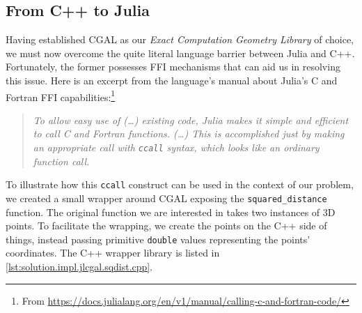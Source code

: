 \subsection{From C++ to Julia}%
\label{sec:solution.impl.jlcgal}


Having established \ac{CGAL} as our \textit{Exact Computation Geometry Library}
of choice, we must now overcome the quite literal language barrier between Julia
and C++.  Fortunately, the former possesses \ac{FFI} mechanisms that can aid us
in resolving this issue.  Here is an excerpt from the language's manual about
Julia's C and Fortran \ac{FFI} capabilities:\footnote{From
\url{https://docs.julialang.org/en/v1/manual/calling-c-and-fortran-code/}}

\begin{quote}
  \itshape\color{gray}
  To allow easy use of (\ldots) existing code, Julia makes it simple and
  efficient to call C and Fortran functions.  (\ldots) This is accomplished just
  by making an appropriate call with \texttt{ccall} syntax, which
  looks like an ordinary function call.
\end{quote}

To illustrate how this \texttt{ccall} construct can be used in the
context of our problem, we created a small wrapper around \ac{CGAL} exposing the
\texttt{squared\_distance} function.  The original function we are interested in
takes two instances of 3D points.  To facilitate the wrapping, we create the
points on the C++ side of things, instead passing primitive
\texttt{double} values representing the points' coordinates.  The C++
wrapper library is listed in \cref{lst:solution.impl.jlcgal.sqdist.cpp}.

